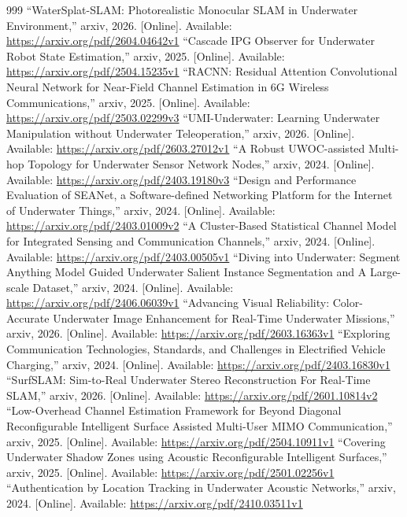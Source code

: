 \documentclass[10pt,journal]{IEEEtran}
\begin{document}
\begin{thebibliography}{999}
 ``WaterSplat-SLAM: Photorealistic Monocular SLAM in Underwater Environment,'' arxiv, 2026. [Online]. Available: \url{https://arxiv.org/pdf/2604.04642v1}
 ``Cascade IPG Observer for Underwater Robot State Estimation,'' arxiv, 2025. [Online]. Available: \url{https://arxiv.org/pdf/2504.15235v1}
 ``RACNN: Residual Attention Convolutional Neural Network for Near-Field Channel Estimation in 6G Wireless Communications,'' arxiv, 2025. [Online]. Available: \url{https://arxiv.org/pdf/2503.02299v3}
 ``UMI-Underwater: Learning Underwater Manipulation without Underwater Teleoperation,'' arxiv, 2026. [Online]. Available: \url{https://arxiv.org/pdf/2603.27012v1}
 ``A Robust UWOC-assisted Multi-hop Topology for Underwater Sensor Network Nodes,'' arxiv, 2024. [Online]. Available: \url{https://arxiv.org/pdf/2403.19180v3}
 ``Design and Performance Evaluation of SEANet, a Software-defined Networking Platform for the Internet of Underwater Things,'' arxiv, 2024. [Online]. Available: \url{https://arxiv.org/pdf/2403.01009v2}
 ``A Cluster-Based Statistical Channel Model for Integrated Sensing and Communication Channels,'' arxiv, 2024. [Online]. Available: \url{https://arxiv.org/pdf/2403.00505v1}
 ``Diving into Underwater: Segment Anything Model Guided Underwater Salient Instance Segmentation and A Large-scale Dataset,'' arxiv, 2024. [Online]. Available: \url{https://arxiv.org/pdf/2406.06039v1}
 ``Advancing Visual Reliability: Color-Accurate Underwater Image Enhancement for Real-Time Underwater Missions,'' arxiv, 2026. [Online]. Available: \url{https://arxiv.org/pdf/2603.16363v1}
 ``Exploring Communication Technologies, Standards, and Challenges in Electrified Vehicle Charging,'' arxiv, 2024. [Online]. Available: \url{https://arxiv.org/pdf/2403.16830v1}
 ``SurfSLAM: Sim-to-Real Underwater Stereo Reconstruction For Real-Time SLAM,'' arxiv, 2026. [Online]. Available: \url{https://arxiv.org/pdf/2601.10814v2}
 ``Low-Overhead Channel Estimation Framework for Beyond Diagonal Reconfigurable Intelligent Surface Assisted Multi-User MIMO Communication,'' arxiv, 2025. [Online]. Available: \url{https://arxiv.org/pdf/2504.10911v1}
 ``Covering Underwater Shadow Zones using Acoustic Reconfigurable Intelligent Surfaces,'' arxiv, 2025. [Online]. Available: \url{https://arxiv.org/pdf/2501.02256v1}
 ``Authentication by Location Tracking in Underwater Acoustic Networks,'' arxiv, 2024. [Online]. Available: \url{https://arxiv.org/pdf/2410.03511v1}

\end{thebibliography}
\end{document}
